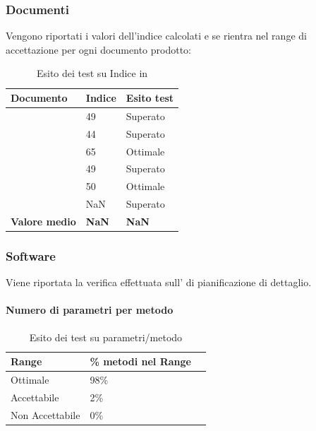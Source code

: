 \documentclass[12pt,a4paper]{article}
\begin{document}
\subsubsection{Documenti}
Vengono riportati i valori dell'indice  calcolati e se rientra nel range di accettazione per ogni documento prodotto:
\begin{table}[H]
	\begin{center}
		\begin{tabular}{p{} p{} p{}}
			\toprule
			\textbf{Documento}   & \textbf{Indice \mgls{gulpease}}	& \textbf{Esito test} \\ \midrule
			\midrule
			\NdP & 49 &  Superato \\ \midrule
			\SdF & 44 &  Superato \\ \midrule
			\AdR & 65 &  Ottimale \\ \midrule
			\PdP & 49 &  Superato \\ \midrule
			\PdQ & 50 &  Ottimale \\ \midrule
			\DP & NaN  &  Superato \\ \midrule \midrule
			\textbf{Valore medio} & \textbf{NaN}& \textbf{NaN}\\ 
			\bottomrule
		\end{tabular}
	\end{center}
	\caption{Esito dei test su Indice  in \FPD}
\end{table}

\subsubsection{Software}
Viene riportata la verifica effettuata sull'  di pianificazione di dettaglio. 
\paragraph{Numero di parametri per metodo}
\begin{table}[H]
	\begin{center}
		\begin{tabular}{p{} p{} p{}}
			\toprule
			\textbf{Range}   & \textbf{\% metodi nel Range}	 \\ \midrule
			\midrule
			Ottimale & 98\% \\ \midrule
			Accettabile & 2\%  \\ \midrule
			Non Accettabile  & 0\%  \\ \midrule
			\bottomrule
		\end{tabular}
	\end{center}
	\caption{Esito dei test su  parametri/metodo}
\end{table}
\end{document}
